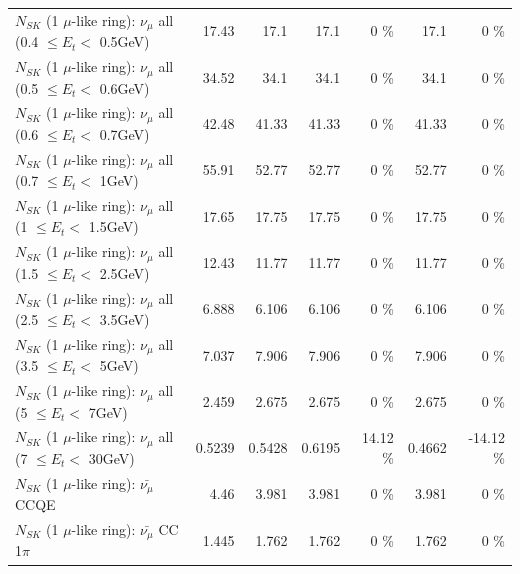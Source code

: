 \begin{table}
\begin{tabular}{| l | r | r | r  r | r  r |}
       $N_{SK}$ (1 $\mu$-like ring): $\nu_{\mu}$ all (0.4 $\leq E_{t} <$ 0.5GeV) &           17.43 &            17.1 &            17.1 &        0 \%  &            17.1 &        0 \%  \\ 
       $N_{SK}$ (1 $\mu$-like ring): $\nu_{\mu}$ all (0.5 $\leq E_{t} <$ 0.6GeV) &           34.52 &            34.1 &            34.1 &        0 \%  &            34.1 &        0 \%  \\ 
       $N_{SK}$ (1 $\mu$-like ring): $\nu_{\mu}$ all (0.6 $\leq E_{t} <$ 0.7GeV) &           42.48 &           41.33 &           41.33 &        0 \%  &           41.33 &        0 \%  \\ 
         $N_{SK}$ (1 $\mu$-like ring): $\nu_{\mu}$ all (0.7 $\leq E_{t} <$ 1GeV) &           55.91 &           52.77 &           52.77 &        0 \%  &           52.77 &        0 \%  \\ 
         $N_{SK}$ (1 $\mu$-like ring): $\nu_{\mu}$ all (1 $\leq E_{t} <$ 1.5GeV) &           17.65 &           17.75 &           17.75 &        0 \%  &           17.75 &        0 \%  \\ 
       $N_{SK}$ (1 $\mu$-like ring): $\nu_{\mu}$ all (1.5 $\leq E_{t} <$ 2.5GeV) &           12.43 &           11.77 &           11.77 &        0 \%  &           11.77 &        0 \%  \\ 
       $N_{SK}$ (1 $\mu$-like ring): $\nu_{\mu}$ all (2.5 $\leq E_{t} <$ 3.5GeV) &           6.888 &           6.106 &           6.106 &        0 \%  &           6.106 &        0 \%  \\ 
         $N_{SK}$ (1 $\mu$-like ring): $\nu_{\mu}$ all (3.5 $\leq E_{t} <$ 5GeV) &           7.037 &           7.906 &           7.906 &        0 \%  &           7.906 &        0 \%  \\ 
           $N_{SK}$ (1 $\mu$-like ring): $\nu_{\mu}$ all (5 $\leq E_{t} <$ 7GeV) &           2.459 &           2.675 &           2.675 &        0 \%  &           2.675 &        0 \%  \\ 
          $N_{SK}$ (1 $\mu$-like ring): $\nu_{\mu}$ all (7 $\leq E_{t} <$ 30GeV) &          0.5239 &          0.5428 &          0.6195 &    14.12 \%  &          0.4662 &   -14.12 \%  \\ 
\hline
\hline
\hline
                              $N_{SK}$ (1 $\mu$-like ring): $\bar{\nu_\mu}$ CCQE &            4.46 &           3.981 &           3.981 &        0 \%  &           3.981 &        0 \%  \\ 
                         $N_{SK}$ (1 $\mu$-like ring): $\bar{\nu_\mu}$ CC 1$\pi$ &           1.445 &           1.762 &           1.762 &        0 \%  &           1.762 &        0 \%  \\ 

\end{tabular}
\end{table}
